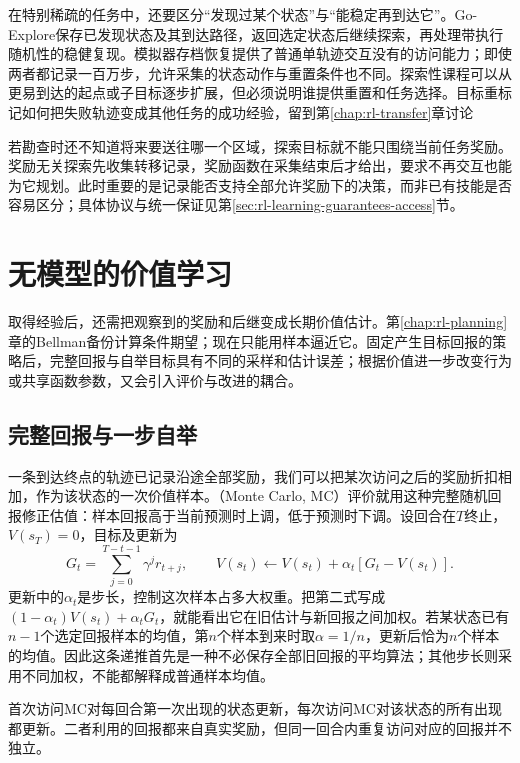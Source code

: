 在特别稀疏的任务中，还要区分“发现过某个状态”与“能稳定再到达它”。Go-Explore保存已发现状态及其到达路径，返回选定状态后继续探索，再处理带执行随机性的稳健复现。模拟器存档恢复提供了普通单轨迹交互没有的访问能力；即使两者都记录一百万步，允许采集的状态动作与重置条件也不同。探索性课程可以从更易到达的起点或子目标逐步扩展，但必须说明谁提供重置和任务选择。目标重标记如何把失败轨迹变成其他任务的成功经验，留到第\ref{chap:rl-transfer}章讨论

若勘查时还不知道将来要送往哪一个区域，探索目标就不能只围绕当前任务奖励。奖励无关探索先收集转移记录，奖励函数在采集结束后才给出，要求不再交互也能为它规划。此时重要的是记录能否支持全部允许奖励下的决策，而非已有技能是否容易区分；具体协议与统一保证见第\ref{sec:rl-learning-guarantees-access}节。

\section{无模型的价值学习}
\label{sec:rl-learning-value}

取得经验后，还需把观察到的奖励和后继变成长期价值估计。第\ref{chap:rl-planning}章的Bellman备份计算条件期望；现在只能用样本逼近它。固定产生目标回报的策略后，完整回报与自举目标具有不同的采样和估计误差；根据价值进一步改变行为或共享函数参数，又会引入评价与改进的耦合。

\subsection{完整回报与一步自举}
\label{sec:rl-learning-mc-td}

一条到达终点的轨迹已记录沿途全部奖励，我们可以把某次访问之后的奖励折扣相加，作为该状态的一次价值样本。（Monte Carlo, MC）评价就用这种完整随机回报修正估值：样本回报高于当前预测时上调，低于预测时下调。设回合在$T$终止，$V(s_T)=0$，目标及更新为
\begin{equation}
  G_t=\sum_{j=0}^{T-t-1}\gamma^j r_{t+j},
  \qquad
  V(s_t)\leftarrow V(s_t)+\alpha_t[G_t-V(s_t)].
  \label{eq:rl-learning-mc}
\end{equation}
更新中的$\alpha_t$是步长，控制这次样本占多大权重。把第二式写成$(1-\alpha_t)V(s_t)+\alpha_tG_t$，就能看出它在旧估计与新回报之间加权。若某状态已有$n-1$个选定回报样本的均值，第$n$个样本到来时取$\alpha=1/n$，更新后恰为$n$个样本的均值。因此这条递推首先是一种不必保存全部旧回报的平均算法；其他步长则采用不同加权，不能都解释成普通样本均值。

首次访问MC对每回合第一次出现的状态更新，每次访问MC对该状态的所有出现都更新。二者利用的回报都来自真实奖励，但同一回合内重复访问对应的回报并不独立。

